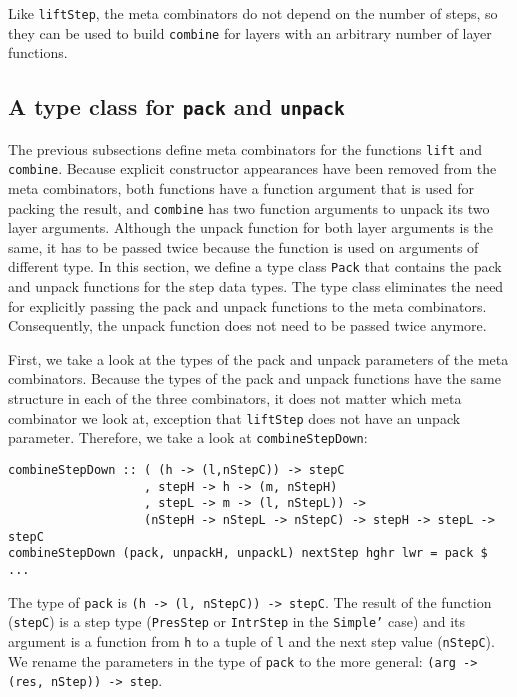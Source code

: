 Like \texttt{liftStep}, the meta combinators do not depend on the number of steps, so they can be used to build \texttt{combine} for layers with an arbitrary number of layer functions.


%																
\subsection{A type class for \texttt{pack} and \texttt{unpack}} \label{subsecttypeclass}

The previous subsections define meta combinators for the functions \texttt{lift} and \texttt{combine}. Because explicit constructor appearances have been removed from the meta combinators, both functions have a function argument that is used for packing the result, and \texttt{combine} has two function arguments to unpack its two layer arguments. Although the unpack function for both layer arguments is the same, it has to be passed twice because the function is used on arguments of different type. In this section, we define a type class \texttt{Pack} that contains the pack and unpack functions for the step data types. The type class eliminates the need for explicitly passing the pack and unpack functions to the meta combinators. Consequently, the unpack function does not need to be passed twice anymore. 

First, we take a look at the types of the pack and unpack parameters of the meta combinators. Because the types of the pack and unpack functions have the same structure in each of the three combinators, it does not matter which meta combinator we look at, exception that \texttt{liftStep} does not have an unpack parameter. Therefore, we take a look at \texttt{combineStepDown}:

\begin{small}
\begin{verbatim}
combineStepDown :: ( (h -> (l,nStepC)) -> stepC 
                   , stepH -> h -> (m, nStepH)
                   , stepL -> m -> (l, nStepL)) -> 
                   (nStepH -> nStepL -> nStepC) -> stepH -> stepL -> stepC
combineStepDown (pack, unpackH, unpackL) nextStep hghr lwr = pack $ ...

\end{verbatim}
\end{small}

The type of \texttt{pack} is \texttt{(h -> (l, nStepC)) -> stepC}. The result of the function (\texttt{stepC}) is a step type (\texttt{PresStep} or \texttt{IntrStep} in the \texttt{Simple'} case) and its argument is a function from \texttt{h} to a tuple of \texttt{l} and the next step value (\texttt{nStepC}). We rename the parameters in the type of \texttt{pack} to the more general: \texttt{(arg -> (res, nStep)) -> step}.

